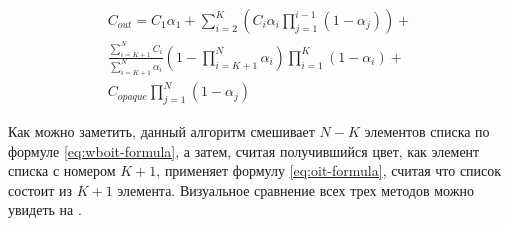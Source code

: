 			\begin{equation}
				\label{eq:hybrid-formula}
				\begin{multlined}	 
					C_{out} = C_{1}\alpha_1 +
					\sum_{i=2}^{K}(C_i\alpha_i\prod _{j=1}^{i - 1}(1 - \alpha_j)) + \\
					\frac{\sum_{i=K+1}^{N}C_i}{\sum_{i=K+1}^{N}\alpha_i}(1 - \prod_{i=K+1}^{N}\alpha_i)\prod _{i=1}^{K}(1 - \alpha_i) + \\	
					C_{opaque}\prod _{j=1}^{N}(1 - \alpha_j)   
				\end{multlined}
			\end{equation}
			
			Как можно заметить, данный алгоритм смешивает $N-K$ элементов списка по формуле \ref{eq:wboit-formula}, а затем, считая получившийся цвет, как элемент списка с номером $K+1$, применяет формулу \ref{eq:oit-formula}, считая что список состоит из $K+1$ элемента. Визуальное сравнение всех трех методов можно увидеть на .
		

